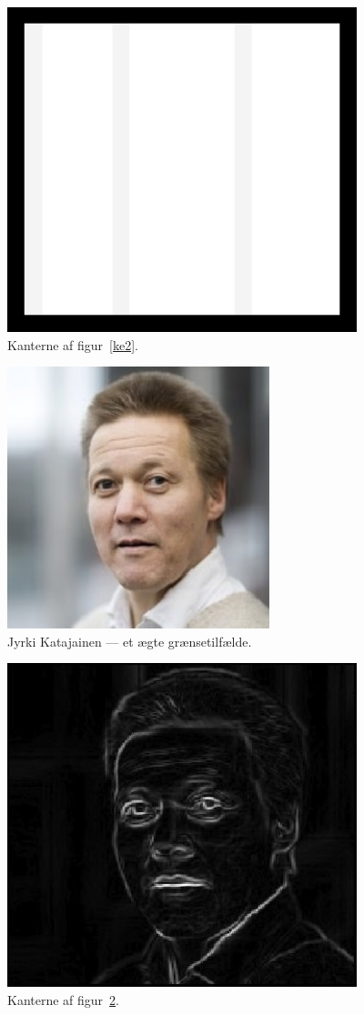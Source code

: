 \documentclass{article}
\begin{document}
	\begin{figure}
		\centering
		\includegraphics[width=4in]{test2_result.png}
		\caption{Kanterne af figur~\ref{ke2}.}
		\label{ke2r}
	\end{figure}
	\begin{figure}
		\centering
		\includegraphics[width=3in]{test3.jpg}
		\caption{Jyrki Katajainen --- et ægte grænsetilfælde.}
		\label{ke3}
	\end{figure}
	\begin{figure}
		\centering
		\includegraphics[width=4in]{test3_result.jpg}
		\caption{Kanterne af figur~\ref{ke3}.}
		\label{ke3r}
	\end{figure}
\end{document}
